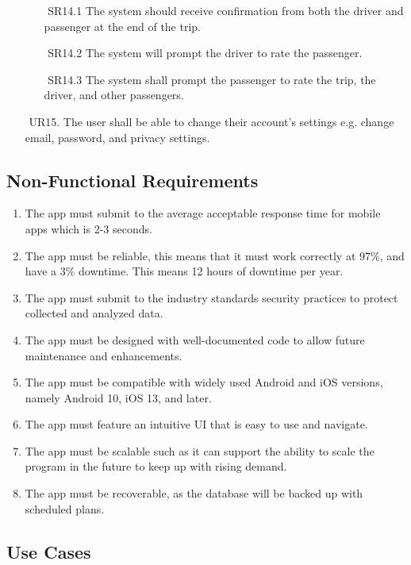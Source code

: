\documentclass[a4paper, 12pt]{report} %
\begin{document}
\begin{itemize}
                \begin{itemize}
                    \item [$ $] SR14.1 The system should receive confirmation from both the driver and passenger at the end of the trip. 
                    \item [$ $] SR14.2 The system will prompt the driver to rate the passenger. 
                    \item [$ $] SR14.3 The system shall prompt the passenger to rate the trip, the driver, and other passengers. 
                \end{itemize}
                \item [$ $] UR15. The user shall be able to change their account’s settings e.g. change email, password, and privacy settings.  
           \end{itemize}
        \subsection{Non-Functional Requirements}
        \begin{enumerate}
            \item The app must submit to the average acceptable response time for mobile apps which is 2-3 seconds.
            \item The app must be reliable, this means that it must work correctly at 97\%, and have a 3\% downtime. This means 12 hours of downtime per year.
            \item The app must submit to the industry standards security practices to protect collected and analyzed data.
            \item The app must be designed with well-documented code to allow future maintenance and enhancements.
            \item The app must be compatible with widely used Android and iOS versions, namely Android 10, iOS 13, and later.
            \item The app must feature an intuitive UI that is easy to use and navigate.
            \item The app must be scalable such as it can support the ability to scale the program in the future to keep up with rising demand.
            \item The app must be recoverable, as the database will be backed up with scheduled plans.
        \end{enumerate}
    \subsection{Use Cases}
\end{document}
